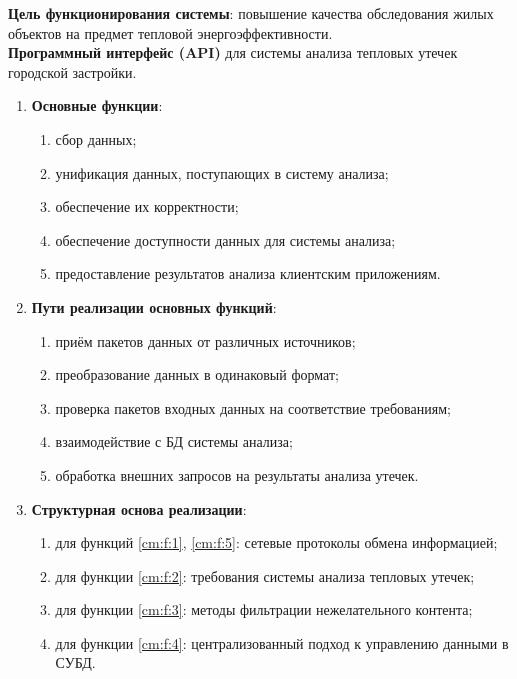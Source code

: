 \textbf{Цель функционирования системы}: повышение качества обследования жилых объектов на предмет тепловой энергоэффективности. \\
 
\textbf{Программный интерфейс (API)} для системы анализа тепловых утечек городской застройки.

\begin{enumerate}
 
	\item \textbf{Основные функции}:

	\begin{enumerate}[label=\labelenumi.\arabic*]
		\item сбор данных; \label{cm:f:1}
		\item унификация данных, поступающих в систему анализа; \label{cm:f:2}
		\item обеспечение их корректности; \label{cm:f:3}
		\item обеспечение доступности данных для системы анализа; \label{cm:f:4}
		\item предоставление результатов анализа клиентским приложениям. \label{cm:f:5}
	\end{enumerate}

	\item \textbf{Пути реализации основных функций}:

	\begin{enumerate}
		\item приём пакетов данных от различных источников;
		\item преобразование данных в одинаковый формат;
		\item проверка пакетов входных данных на соответствие требованиям;
		\item взаимодействие с БД системы анализа;
		\item обработка внешних запросов на результаты анализа утечек.
	\end{enumerate}

	\item \textbf{Структурная основа реализации}:

	\begin{enumerate}
		\item для функций \ref{cm:f:1}, \ref{cm:f:5}: сетевые протоколы обмена информацией;
		\item для функции \ref{cm:f:2}: требования системы анализа тепловых утечек;
		\item для функции \ref{cm:f:3}: методы фильтрации нежелательного контента;
		\item для функции \ref{cm:f:4}: централизованный подход к управлению данными в СУБД.
	\end{enumerate}


\end{enumerate}
